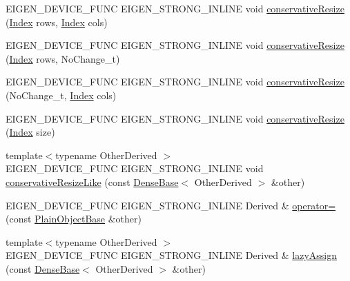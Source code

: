 \begin{DoxyCompactItemize}
\item 
E\+I\+G\+E\+N\+\_\+\+D\+E\+V\+I\+C\+E\+\_\+\+F\+U\+NC E\+I\+G\+E\+N\+\_\+\+S\+T\+R\+O\+N\+G\+\_\+\+I\+N\+L\+I\+NE void \hyperlink{class_eigen_1_1_plain_object_base_a5e06c62950ba98fe8ba9c7d4be9c19e4}{conservative\+Resize} (\hyperlink{namespace_eigen_a62e77e0933482dafde8fe197d9a2cfde}{Index} rows, \hyperlink{namespace_eigen_a62e77e0933482dafde8fe197d9a2cfde}{Index} cols)
\item 
E\+I\+G\+E\+N\+\_\+\+D\+E\+V\+I\+C\+E\+\_\+\+F\+U\+NC E\+I\+G\+E\+N\+\_\+\+S\+T\+R\+O\+N\+G\+\_\+\+I\+N\+L\+I\+NE void \hyperlink{class_eigen_1_1_plain_object_base_a528879aef40f9cbc4ab4925e4a6bceb9}{conservative\+Resize} (\hyperlink{namespace_eigen_a62e77e0933482dafde8fe197d9a2cfde}{Index} rows, No\+Change\+\_\+t)
\item 
E\+I\+G\+E\+N\+\_\+\+D\+E\+V\+I\+C\+E\+\_\+\+F\+U\+NC E\+I\+G\+E\+N\+\_\+\+S\+T\+R\+O\+N\+G\+\_\+\+I\+N\+L\+I\+NE void \hyperlink{class_eigen_1_1_plain_object_base_a46afa73816539b0fe36c6e9abd7978a6}{conservative\+Resize} (No\+Change\+\_\+t, \hyperlink{namespace_eigen_a62e77e0933482dafde8fe197d9a2cfde}{Index} cols)
\item 
E\+I\+G\+E\+N\+\_\+\+D\+E\+V\+I\+C\+E\+\_\+\+F\+U\+NC E\+I\+G\+E\+N\+\_\+\+S\+T\+R\+O\+N\+G\+\_\+\+I\+N\+L\+I\+NE void \hyperlink{class_eigen_1_1_plain_object_base_a5429214e7c1ffaf7294a93a5cec62007}{conservative\+Resize} (\hyperlink{namespace_eigen_a62e77e0933482dafde8fe197d9a2cfde}{Index} size)
\item 
{\footnotesize template$<$typename Other\+Derived $>$ }\\E\+I\+G\+E\+N\+\_\+\+D\+E\+V\+I\+C\+E\+\_\+\+F\+U\+NC E\+I\+G\+E\+N\+\_\+\+S\+T\+R\+O\+N\+G\+\_\+\+I\+N\+L\+I\+NE void \hyperlink{class_eigen_1_1_plain_object_base_a7775d274035c4ef541aa0fc9a3ad30a2}{conservative\+Resize\+Like} (const \hyperlink{group___core___module_class_eigen_1_1_dense_base}{Dense\+Base}$<$ Other\+Derived $>$ \&other)
\item 
E\+I\+G\+E\+N\+\_\+\+D\+E\+V\+I\+C\+E\+\_\+\+F\+U\+NC E\+I\+G\+E\+N\+\_\+\+S\+T\+R\+O\+N\+G\+\_\+\+I\+N\+L\+I\+NE Derived \& \hyperlink{class_eigen_1_1_plain_object_base_a75308f8a23a03f045a1260611e2054a0}{operator=} (const \hyperlink{class_eigen_1_1_plain_object_base}{Plain\+Object\+Base} \&other)
\item 
{\footnotesize template$<$typename Other\+Derived $>$ }\\E\+I\+G\+E\+N\+\_\+\+D\+E\+V\+I\+C\+E\+\_\+\+F\+U\+NC E\+I\+G\+E\+N\+\_\+\+S\+T\+R\+O\+N\+G\+\_\+\+I\+N\+L\+I\+NE Derived \& \hyperlink{class_eigen_1_1_plain_object_base_a6008cee3b716d514b3e14c1bc7c0d34a}{lazy\+Assign} (const \hyperlink{group___core___module_class_eigen_1_1_dense_base}{Dense\+Base}$<$ Other\+Derived $>$ \&other)

\end{DoxyCompactItemize}
